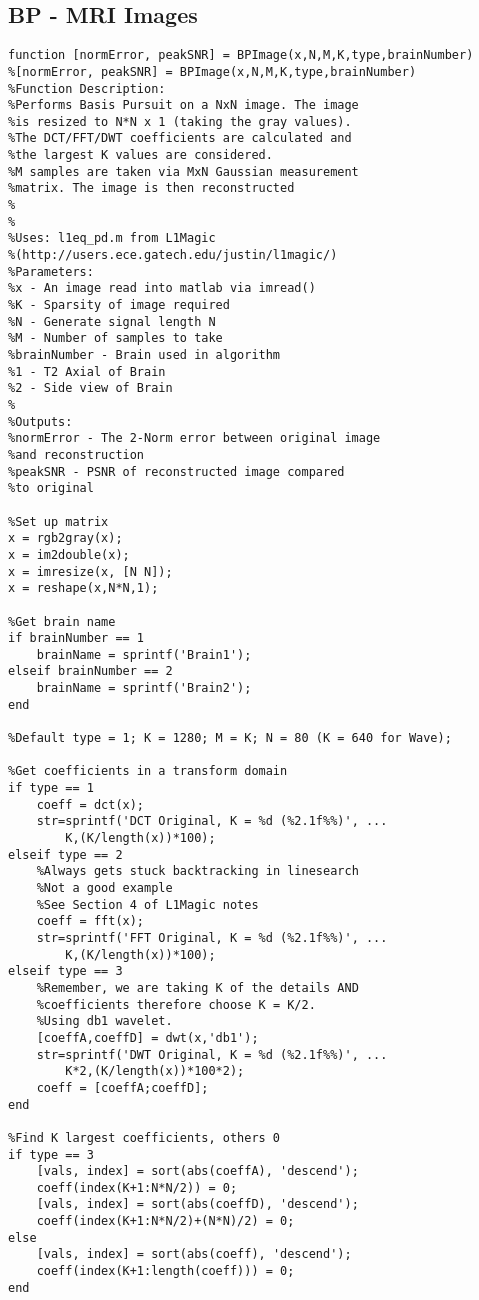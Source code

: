 \documentclass[titlepage,oneside, 12pt]{book}
\theoremstyle{break}
\begin{document}
\begin{appendices}
\chapter{BP - MRI Images}
\begin{lstlisting}[label={lst:ex1DMRI}]
function [normError, peakSNR] = BPImage(x,N,M,K,type,brainNumber)
%[normError, peakSNR] = BPImage(x,N,M,K,type,brainNumber)
%Function Description: 
%Performs Basis Pursuit on a NxN image. The image
%is resized to N*N x 1 (taking the gray values).
%The DCT/FFT/DWT coefficients are calculated and 
%the largest K values are considered. 
%M samples are taken via MxN Gaussian measurement 
%matrix. The image is then reconstructed
%
%
%Uses: l1eq_pd.m from L1Magic 
%(http://users.ece.gatech.edu/justin/l1magic/)
%Parameters:
%x - An image read into matlab via imread()
%K - Sparsity of image required
%N - Generate signal length N
%M - Number of samples to take
%brainNumber - Brain used in algorithm
%1 - T2 Axial of Brain
%2 - Side view of Brain
%
%Outputs:
%normError - The 2-Norm error between original image
%and reconstruction
%peakSNR - PSNR of reconstructed image compared 
%to original

%Set up matrix
x = rgb2gray(x);
x = im2double(x);
x = imresize(x, [N N]);
x = reshape(x,N*N,1);

%Get brain name
if brainNumber == 1
    brainName = sprintf('Brain1');
elseif brainNumber == 2
    brainName = sprintf('Brain2');
end

%Default type = 1; K = 1280; M = K; N = 80 (K = 640 for Wave);

%Get coefficients in a transform domain
if type == 1
    coeff = dct(x);
    str=sprintf('DCT Original, K = %d (%2.1f%%)', ...
        K,(K/length(x))*100);
elseif type == 2
    %Always gets stuck backtracking in linesearch
    %Not a good example
    %See Section 4 of L1Magic notes
    coeff = fft(x);
    str=sprintf('FFT Original, K = %d (%2.1f%%)', ...
        K,(K/length(x))*100);
elseif type == 3
    %Remember, we are taking K of the details AND 
    %coefficients therefore choose K = K/2. 
    %Using db1 wavelet.
    [coeffA,coeffD] = dwt(x,'db1');
    str=sprintf('DWT Original, K = %d (%2.1f%%)', ...
        K*2,(K/length(x))*100*2);
    coeff = [coeffA;coeffD];    
end
   
%Find K largest coefficients, others 0
if type == 3
    [vals, index] = sort(abs(coeffA), 'descend');
    coeff(index(K+1:N*N/2)) = 0;
    [vals, index] = sort(abs(coeffD), 'descend');
    coeff(index(K+1:N*N/2)+(N*N)/2) = 0;
else
    [vals, index] = sort(abs(coeff), 'descend');
    coeff(index(K+1:length(coeff))) = 0;
end



\end{lstlisting}
\end{appendices}
\end{document}
